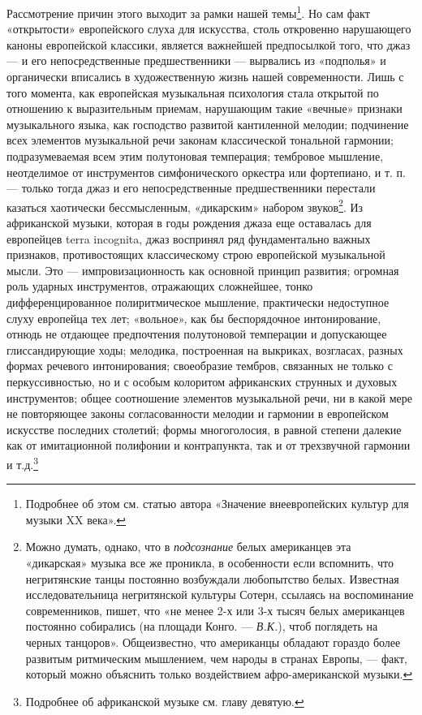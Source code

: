 Рассмотрение     причин    этого     выходит     за    рамки     нашей
темы\footnote{Подробнее   об   этом   см.  статью   автора   «Значение
внеевропейских культур для музыки XX века».}. Но сам факт «открытости»
европейского  слуха   для  искусства,  столь   откровенно  нарушающего
каноны  европейской классики,  является  важнейшей предпосылкой  того,
что  джаз —  и  его непосредственные  предшественники  — вырвались  из
«подполья»  и  органически  вписались  в  художественную  жизнь  нашей
современности.  Лишь  с  того  момента,  как  европейская  музыкальная
психология  стала  открытой  по  отношению  к  выразительным  приемам,
нарушающим такие «вечные» признаки  музыкального языка, как господство
развитой  кантиленной мелодии;  подчинение всех  элементов музыкальной
речи  законам классической  тональной  гармонии; подразумеваемая  всем
этим  полутоновая  темперация;   тембровое  мышление,  неотделимое  от
инструментов симфонического оркестра или фортепиано,  и т. п. — только
тогда джаз  и его непосредственные предшественники  перестали казаться
хаотически  бессмысленным,  «дикарским» набором  звуков\footnote{Можно
думать,  однако,  что  в   \emph{подсознание}  белых  американцев  эта
«дикарская»  музыка все  же  проникла, в  особенности если  вспомнить,
что  негритянские   танцы  постоянно  возбуждали   любопытство  белых.
Известная  исследовательница  негритянской культуры  Сотерн,  ссылаясь
на  воспоминание  современников, пишет,  что  «не  менее 2-х  или  3-х
тысяч  белых американцев  постоянно  собирались (на  площади Конго.  —
\emph{В.К.}), чтоб  поглядеть на  черных танцоров».  Общеизвестно, что
американцы  обладают  гораздо  более развитым  ритмическим  мышлением,
чем  народы  в  странах  Европы,   —  факт,  который  можно  объяснить
только воздействием афро-американской музыки.}. Из африканской музыки,
которая  в годы  рождения джаза  еще оставалась  для европейцев  terra
incognita,  джаз   воспринял  ряд  фундаментально   важных  признаков,
противостоящих классическому строю  европейской музыкальной мысли. Это
—  импровизационность как  основной  принцип  развития; огромная  роль
ударных инструментов, отражающих  сложнейшее, тонко дифференцированное
полиритмическое мышление, практически  недоступное слуху европейца тех
лет; «вольное», как бы беспорядочное интонирование, отнюдь не отдающее
предпочтения  полутоновой  темперации  и  допускающее  глиссандирующие
ходы;  мелодика, построенная  на  выкриках,  возгласах, разных  формах
речевого  интонирования; своеобразие  тембров, связанных  не только  с
перкуссивностью,  но  и  с  особым колоритом  африканских  струнных  и
духовых инструментов; общее соотношение элементов музыкальной речи, ни
в какой мере не повторяющее  законы согласованности мелодии и гармонии
в  европейском искусстве  последних  столетий;  формы многоголосия,  в
равной степени  далекие как от имитационной  полифонии и контрапункта,
так и от трехзвучной гармонии и т.д.\footnote{Подробнее об африканской
музыке см. главу девятую.}

